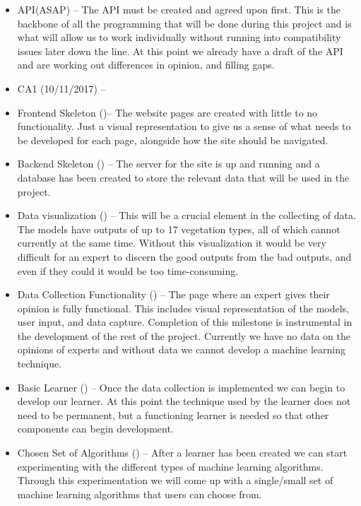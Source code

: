 \documentclass{ecmm427_assignment}
\begin{document}
\begin{itemize}

\item API(ASAP) – The API must be created and agreed upon first. This is the backbone of all the programming that will be done during this project and is what will allow us to work individually without running into compatibility issues later down the line. At this point we already have a draft of the API and are working out differences in opinion, and filling gaps.

\item CA1 (10/11/2017) – 

\item Frontend Skeleton ()– The website pages are created with little to no functionality. Just a visual representation to give us a sense of what needs to be developed for each page, alongside how the site should be navigated.

\item Backend Skeleton () –  The server for the site is up and running and a database has been created to store the relevant data that will be used in the project. 

\item Data visualization () –  This will be a crucial element in the collecting of data. The models have outputs of up to 17 vegetation types, all of which cannot currently at the same time. Without this visualization it would be very difficult for an expert to discern the good outputs from the bad outputs, and even if they could it would be too time-consuming.

\item Data Collection Functionality () – The page where an expert gives their opinion is fully functional. This includes visual representation of the models, user input, and data capture. Completion of this milestone is instrumental in the development of the rest of the project. Currently we have no data on the opinions of experts and without data we cannot develop a machine learning technique.

\item Basic Learner () – Once the data collection is implemented we can begin to develop our learner. At this point the technique used by the learner does not need to be permanent, but a functioning learner is needed so that other components can begin development.

\item Chosen Set of Algorithms () – After a learner has been created we can start experimenting with the different types of machine learning algorithms. Through this experimentation we will come up with a single/small set of machine learning algorithms that users can choose from.


\end{itemize}
\end{document}
